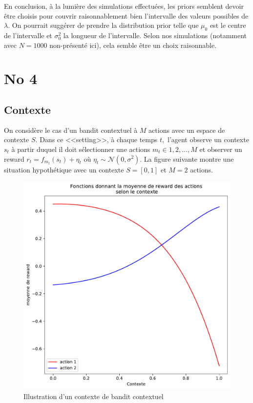 \documentclass[letterpaper,11pt]{article}
\begin{document}
En conclusion, à la lumière des simulations effectuées, les priors semblent devoir être choisis pour couvrir raisonnablement bien l'intervalle des valeurs possibles de $\lambda.$ On pourrait suggérer de prendre la distribution prior telle que $\mu_0$ est le centre de l'intervalle et $\sigma^2_0$ la longueur de l'intervalle. Selon nos simulations (notamment avec $N=1000$ non-présenté ici), cela semble être un choix raisonnable.

\section{No 4}

\subsection{Contexte}

On considère le cas d'un bandit contextuel à $M$ actions avec un espace de contexte $S.$ Dans ce <<setting>>, à chaque temps $t,$ l'agent observe un contexte $s_t$ à partir duquel il doit sélectionner une actions $m_t\in{1,2,\ldots,M}$ et observer un reward $r_t=f_{m_t}(s_t)+\eta_t$ où $\eta_t\sim\mathcal{N}(0,\sigma^2).$ La figure suivante montre une situation hypothétique avec un contexte $S=[0,1]$ et $M=2$ actions.

\begin{figure}[H]
\caption{Illustration d'un contexte de bandit contextuel}\label{figure: contexte}
\begin{center}
\includegraphics[scale=0.5]{image_contexte_no4.pdf}
\end{center}
\end{figure}
\end{document}
